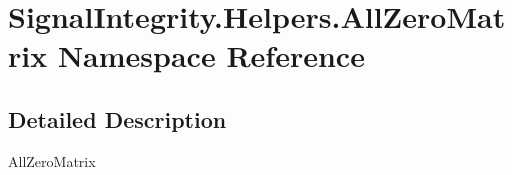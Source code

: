 \hypertarget{namespaceSignalIntegrity_1_1Helpers_1_1AllZeroMatrix}{}\section{Signal\+Integrity.\+Helpers.\+All\+Zero\+Matrix Namespace Reference}
\label{namespaceSignalIntegrity_1_1Helpers_1_1AllZeroMatrix}


\subsection{Detailed Description}
\begin{DoxyVerb}AllZeroMatrix\end{DoxyVerb}
 